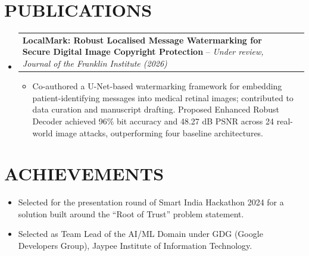 \documentclass[letterpaper,10pt]{article}
\newcommand{\resumeItem}[1]{
  \item\small{
    {#1 \vspace{-2pt}}
  }
}
\newcommand{\resumeProjectHeading}[2]{
    \item
    \begin{tabularx}{\textwidth}{X r}
      \small#1 & #2 \\
    \end{tabularx}\vspace{-6pt}
}
\newcommand{\resumeSubHeadingListStart}{\begin{itemize}[leftmargin=0.0in, label={}]}
\newcommand{\resumeSubHeadingListEnd}{\end{itemize}}
\newcommand{\resumeItemListStart}{\begin{itemize}[leftmargin=0.15in, label={$\bullet$}]}
\newcommand{\resumeItemListEnd}{\end{itemize}\vspace{-5pt}}
\begin{document}
\section{PUBLICATIONS}
  \resumeSubHeadingListStart
    \resumeProjectHeading
      {\textbf{LocalMark: Robust Localised Message Watermarking for Secure Digital Image Copyright Protection} -- \textit{Under review, Journal of the Franklin Institute (2026)}}{ }
      \resumeItemListStart
        \resumeItem{Co-authored a U-Net-based watermarking framework for embedding patient-identifying messages into medical retinal images; contributed to data curation and manuscript drafting. Proposed Enhanced Robust Decoder achieved 96\% bit accuracy and 48.27 dB PSNR across 24 real-world image attacks, outperforming four baseline architectures.}
      \resumeItemListEnd
  \resumeSubHeadingListEnd

\section{ACHIEVEMENTS}
  \resumeItemListStart
    \resumeItem{Selected for the presentation round of Smart India Hackathon 2024 for a solution built around the ``Root of Trust'' problem statement.}
    \resumeItem{Selected as Team Lead of the AI/ML Domain under GDG (Google Developers Group), Jaypee Institute of Information Technology.}
  \resumeItemListEnd
\end{document}
